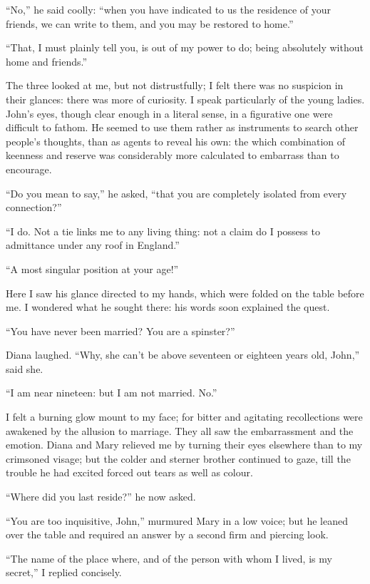 \enquote{No,} he said coolly: \enquote{when you have indicated to us the
	residence of your friends, we can write to them, and you may be restored
	to home.}

\enquote{That, I must plainly tell you, is out of my power to do; being
	absolutely without home and friends.}

The three looked at me, but not distrustfully; I felt there was no
suspicion in their glances: there was more of curiosity. I speak
particularly of the young ladies. \St{} John's eyes, though clear enough
in a literal sense, in a figurative one were difficult to fathom. He
seemed to use them rather as instruments to search other people's
thoughts, than as agents to reveal his own: the which combination of
keenness and reserve was considerably more calculated to embarrass than
to encourage.

\enquote{Do you mean to say,} he asked, \enquote{that you are completely
	isolated from every connection?}

\enquote{I do. Not a tie links me to any living thing: not a claim do I
	possess to admittance under any roof in England.}

\enquote{A most singular position at your age!}

Here I saw his glance directed to my hands, which were folded on the
table before me. I wondered what he sought there: his words soon
explained the quest.

\enquote{You have never been married? You are a spinster?}

Diana laughed. \enquote{Why, she can't be above seventeen or eighteen
	years old, \St{} John,} said she.

\enquote{I am near nineteen: but I am not married. No.}

I felt a burning glow mount to my face; for bitter and agitating
recollections were awakened by the allusion to marriage. They all saw
the embarrassment and the emotion. Diana and Mary relieved me by
turning their eyes elsewhere than to my crimsoned visage; but the colder
and sterner brother continued to gaze, till the trouble he had excited
forced out tears as well as colour.

\enquote{Where did you last reside?} he now asked.

\enquote{You are too inquisitive, \St{} John,} murmured Mary in a low
voice; but he leaned over the table and required an answer by a second
firm and piercing look.

\enquote{The name of the place where, and of the person with whom I
	lived, is my secret,} I replied concisely.

